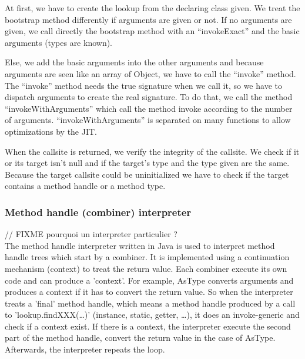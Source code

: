 \documentclass{sig-alternate}
\newcommand{\fixme}[1]{{\color{red} // FIXME #1}\\}
\begin{document}
        

        At first, we have to create the lookup from the declaring class given.
        We treat the bootstrap method differently if arguments are given or not.
        If no arguments are given, we call directly the bootstrap method
        with an ``invokeExact'' and the basic arguments (types are known).

        Else, we add the basic arguments into the other arguments
        and because arguments are seen like an array of Object,
        we have to call the ``invoke'' method.
        The ``invoke'' method needs the true signature when we call it,
        so we have to dispatch arguments to create the real signature.
        To do that, we call the method ``invokeWithArguments''%
        which call the method invoke according to the number of arguments.
        ``invokeWithArguments'' is separated on many functions to allow optimizations by the JIT.

        

        When the callsite is returned, we verify the integrity of the callsite.
        We check if it or its target isn't null and if the target's type and the type given are the same.
        Because the target callsite could be uninitialized we have to check if the target contains a method handle or a method type.

      \subsubsection{Method handle (combiner) interpreter}

        \fixme{pourquoi un interpreter particulier ?}

        The method handle interpreter written in Java
        is used to interpret method handle trees which start by a combiner.
        It is implemented using a continuation mechanism (context) to treat the return value.
        Each combiner execute its own code and can produce a 'context'.
        For example, AsType converts arguments and produces a context if it has to convert the return value.
        So when the interpreter treats a 'final' method handle,
        which means a method handle produced by a call to 'lookup.findXXX(\dots)' (instance, static, getter, \dots),
        it does an invoke-generic and check if a context exist.
        If there is a context, the interpreter execute the second part of the method handle,
        convert the return value in the case of AsType.
        Afterwards, the interpreter repeats the loop.
\end{document}
